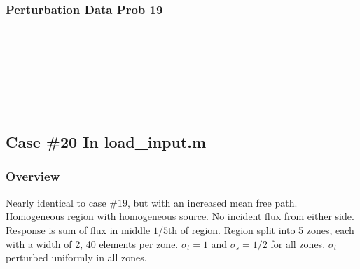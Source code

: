 \documentclass{article}
\begin{document}
\subsubsection{Perturbation Data Prob 19}
\\ \\
\\ \\
\\ \\

\subsection{Case \#20 In load\_input.m}
\subsubsection{Overview}
Nearly identical to case $\#19$, but with an increased mean free path. Homogeneous region with homogeneous source. No incident flux from either side. Response is sum of flux in middle $1/5$th of region. Region split into 5 zones, each with a width of 2, 40 elements per zone. $\sigma_t = 1$ and $\sigma_s=1/2$ for all zones. $\sigma_t$ perturbed uniformly in all zones.
\end{document}
